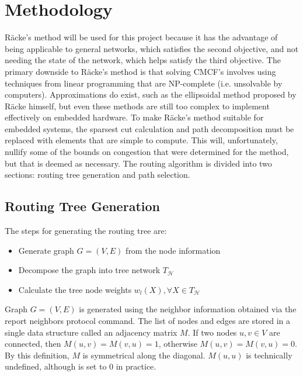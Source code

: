 \section{Methodology}\label{sec:routing:methodology}

R\"acke's method will be used for this project because it has the advantage of being applicable to general networks, which satisfies the second objective, and not needing the state of the network, which helps satisfy the third objective. The primary downside to R\"acke's method is that solving CMCF's involves using techniques from linear programming that are NP-complete (i.e. unsolvable by computers). Approximations do exist, such as the ellipsoidal method proposed by R\"acke himself, but even these methods are still too complex to implement effectively on embedded hardware. To make R\"acke's method suitable for embedded systems, the sparsest cut calculation and path decomposition must be replaced with elements that are simple to compute. This will, unfortunately, nullify some of the bounds on congestion that were determined for the method, but that is deemed as necessary. The routing algorithm is divided into two sections: routing tree generation and path selection.

\subsection{Routing Tree Generation}\label{sec:routing:methodology:routing_tree_generation}

The steps for generating the routing tree are:
\begin{itemize}
	\item Generate graph $G=(V,E) $ from the node information
	\item Decompose the graph into tree network $T_\mathscr{H} $
	\item Calculate the tree node weights $w_l(X), \forall X\in T_\mathscr{H} $
\end{itemize}
Graph $G=(V,E) $ is generated using the neighbor information obtained via the report neighbors protocol command. The list of nodes and edges are stored in a single data structure called an adjacency matrix $M$. If two nodes $u,v\in V $ are connected, then $M(u,v)=M(v,u)=1 $, otherwise $M(u,v)=M(v,u)=0 $. By this definition, $M$ is symmetrical along the diagonal. $M(u,u) $ is technically undefined, although is set to 0 in practice.


